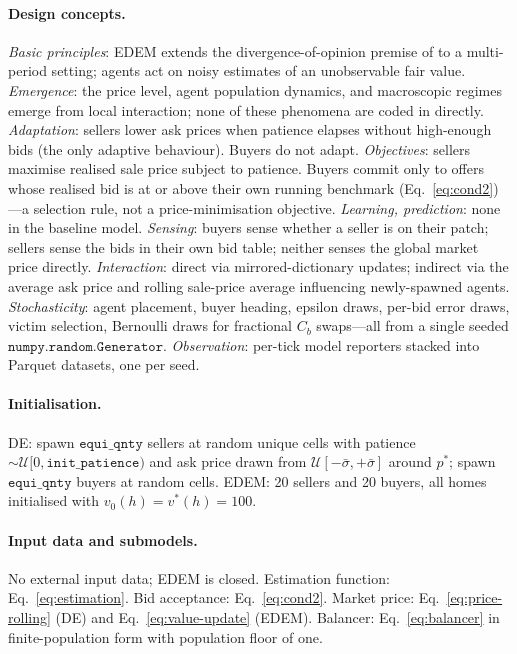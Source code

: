 \documentclass{article}
\begin{document}
\paragraph{Design concepts.}
\emph{Basic principles}: EDEM extends the divergence-of-opinion
premise of \citet{miller1977} to a multi-period setting; agents
act on noisy estimates of an unobservable fair value.
\emph{Emergence}: the price level, agent population dynamics, and
macroscopic regimes emerge from local interaction; none of these
phenomena are coded in directly.
\emph{Adaptation}: sellers lower ask prices when patience elapses
without high-enough bids (the only adaptive behaviour). Buyers do
not adapt.
\emph{Objectives}: sellers maximise realised sale price subject to
patience. Buyers commit only to offers whose realised bid is at or
above their own running benchmark (Eq.~\eqref{eq:cond2})---a
selection rule, not a price-minimisation objective.
\emph{Learning, prediction}: none in the baseline model.
\emph{Sensing}: buyers sense whether a seller is on their patch;
sellers sense the bids in their own bid table; neither senses the
global market price directly.
\emph{Interaction}: direct via mirrored-dictionary updates; indirect
via the average ask price and rolling sale-price average influencing
newly-spawned agents.
\emph{Stochasticity}: agent placement, buyer heading, epsilon draws,
per-bid error draws, victim selection, Bernoulli draws for
fractional $C_b$ swaps---all from a single seeded
$\mathtt{numpy.random.Generator}$.
\emph{Observation}: per-tick model reporters stacked into Parquet
datasets, one per seed.

\paragraph{Initialisation.}
DE: spawn $\mathtt{equi\_qnty}$ sellers at random unique cells
with patience $\sim \mathcal{U}[0, \mathtt{init\_patience})$ and
ask price drawn from $\mathcal{U}[-\bar\sigma, +\bar\sigma]$
around $p^*$; spawn $\mathtt{equi\_qnty}$ buyers at random cells.
EDEM: 20 sellers and 20 buyers, all homes initialised with
$v_0(h) = v^*(h) = 100$.

\paragraph{Input data and submodels.}
No external input data; EDEM is closed. Estimation function:
Eq.~\eqref{eq:estimation}. Bid acceptance: Eq.~\eqref{eq:cond2}.
Market price: Eq.~\eqref{eq:price-rolling} (DE) and
Eq.~\eqref{eq:value-update} (EDEM). Balancer: Eq.~\eqref{eq:balancer}
in finite-population form with population floor of one.
\end{document}
